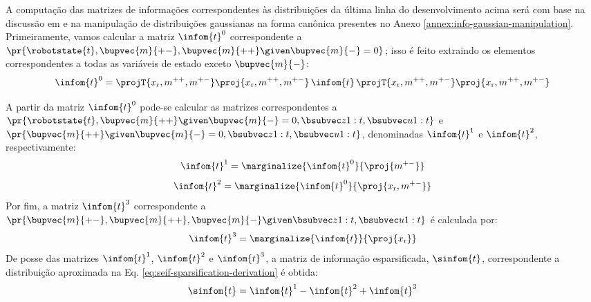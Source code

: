 A computação das matrizes de informações correspondentes às distribuições da última linha do desenvolvimento acima será com base na discussão em \cite[p.~401]{bongard2006probabilistic} e na manipulação de distribuições gaussianas na forma canônica presentes no Anexo \ref{annex:info-gaussian-manipulation}. 
Primeiramente, vamos calcular a matriz $\infom{t}^{0}$ correspondente 
a $\pr{\robotstate{t}, \bupvec{m}{+-}, \bupvec{m}{++} \given \bupvec{m}{-} = 0}$; isso é feito extraindo os elementos correspondentes a 
todas as variáveis de estado exceto $\bupvec{m}{-}$:
\newcommand{\OmegaZeroValue}{\projT{x_\mathrm{r}, m^{++}, m^{+-}} \proj{x_\mathrm{r}, m^{++}, m^{+-}} \, \infom{t} \, \projT{x_\mathrm{r}, m^{++}, m^{+-}} \proj{x_\mathrm{r}, m^{++}, m^{+-}}}
\begin{equation}
  \infom{t}^0 = \OmegaZeroValue
  \label{eq:seif-omega-zero}
\end{equation}

A partir da matriz $\infom{t}^0$ pode-se calcular as matrizes 
correspondentes a\\
$\pr{\robotstate{t},\bupvec{m}{++}  \given \bupvec{m}{-}=0, \slamvars}$ e $\pr{\bupvec{m}{++}  \given \bupvec{m}{-}=0, \slamvars}$, denominadas $\infom{t}^1$ e $\infom{t}^2$, 
respectivamente:
\newcommand{\OmegaOneValue}{\marginalize{\infom{t}^0}{\proj{m^{+-}}}}
\begin{equation}
  \infom{t}^1 = \OmegaOneValue
\end{equation}
\newcommand{\OmegaTwoValue}{\marginalize{\infom{t}^0}{\proj{x_\mathrm{r}, m^{+-}}}}
\begin{equation}
  \infom{t}^2 = \OmegaTwoValue
\end{equation}
Por fim, a matriz $\infom{t}^3$ correspondente a $\pr{\bupvec{m}{+-}, \bupvec{m}{++}, \bupvec{m}{-} \given \slamvars}$ é calculada por:
\newcommand{\OmegaThreeValue}{\marginalize{\infom{t}}{\proj{x_\mathrm{r}}}}
\begin{equation}
  \infom{t}^3 = \OmegaThreeValue
\end{equation}
De posse das matrizes $\infom{t}^1$, $\infom{t}^2$ e $\infom{t}^3$, a 
matriz de informação esparsificada, $\sinfom{t}$, correspondente a distribuição 
aproximada na Eq. \ref{eq:seif-sparsification-derivation} é obtida:
\begin{equation}
  \sinfom{t} = \infom{t}^1 - \infom{t}^2 + \infom{t}^3
  \label{eq:seif-sparse-infom}
\end{equation}

